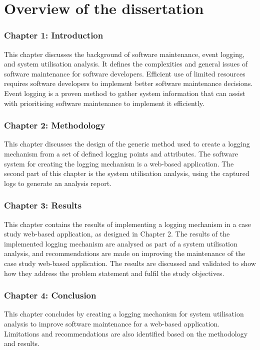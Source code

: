 \clearpage

\section{Overview of the dissertation}
\subsubsection{Chapter 1: Introduction}
This chapter discusses the background of software maintenance, event logging, and system utilisation analysis. It defines the complexities and general issues of software maintenance for software developers. Efficient use of limited resources requires software developers to implement better software maintenance decisions. Event logging is a proven method to gather system information that can assist with prioritising software maintenance to implement it efficiently.

\subsubsection{Chapter 2: Methodology}
This chapter discusses the design of the generic method used to create a logging mechanism from a set of defined logging points and attributes. The software system for creating the logging mechanism is a web-based application. The second part of this chapter is the system utilisation analysis, using the captured logs to generate an analysis report.

\subsubsection{Chapter 3: Results}
This chapter contains the results of implementing a logging mechanism in a case study web-based application, as designed in Chapter 2. The results of the implemented logging mechanism are analysed as part of a system utilisation analysis, and recommendations are made on improving the maintenance of the case study web-based application. The results are discussed and validated to show how they address the problem statement and fulfil the study objectives.

\subsubsection{Chapter 4: Conclusion}
This chapter concludes by creating a logging mechanism for system utilisation analysis to improve software maintenance for a web-based application. Limitations and recommendations are also identified based on the methodology and results.
